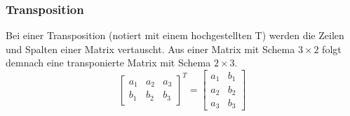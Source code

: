 \documentclass{article}
\begin{document}
\subsubsection{Transposition}
Bei einer Transposition (notiert mit einem hochgestellten T) werden die Zeilen und Spalten einer Matrix vertauscht. Aus einer Matrix mit Schema $3\times 2$ folgt demnach eine transponierte Matrix mit Schema $2\times 3$.
$$
\begin{bmatrix}
		a_1 & a_2 & a_3\\
		b_1 & b_2 & b_3
\end{bmatrix}^{T}
=
\begin{bmatrix}
a_1 & b_1 \\
a_2 & b_2 \\
a_3 & b_3
\end{bmatrix}
$$
\end{document}
